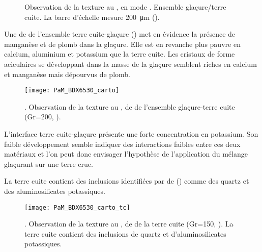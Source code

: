\begin{figure}[htb]
  \caption[\ -- Observation de la texture au \MEB, 
           en mode \ERD. Ensemble glaçure/terre cuite]
          {\legendeC
           Observation de la texture au \MEB, en mode \ERD. 
           Ensemble glaçure/terre cuite. La barre d'échelle mesure 
           \SI{200}{\um} ().}
  \label{MEB:6530_img}
\end{figure}

Une \carto de \RX de l'ensemble terre cuite-glaçure 
() met en évidence la présence de 
manganèse et de plomb dans la glaçure. Elle est en revanche plus 
pauvre en calcium, aluminium et potassium que la terre cuite. Les 
cristaux de forme aciculaires se développant dans la masse de la 
glaçure semblent riches en calcium et manganèse mais dépourvus de 
plomb.

\begin{figure}[htb]
  \texttt{[image: PaM\_BDX6530\_carto]}%
  \caption[\ -- Observation de la texture au \MEB, 
           \carto de \RX de l'ensemble glaçure-terre cuite]
          {\legendeC.
           Observation de la texture au \MEB, 
           \carto de \RX de l'ensemble glaçure-terre cuite 
           (Gr=200, ).}
  \label{MEB:6530_carto_tcgla}
\end{figure}

L'interface terre cuite-glaçure présente une forte concentration en 
potassium. Son faible développement semble indiquer des interactions 
faibles entre ces deux matériaux et l'on peut donc envisager 
l'hypothèse de l'application du mélange glaçurant sur une terre crue.

La terre cuite contient des inclusions identifiées par \carto de \RX 
() comme des quartz et des aluminosilicates 
potassiques.

\begin{figure}[htb]
  \texttt{[image: PaM\_BDX6530\_carto\_tc]}%
  \caption[\ -- Observation de la texture au \MEB, 
           \carto de \RX de la terre cuite]
          {\legendeC.
           Observation de la texture au \MEB, 
           \carto de \RX de la terre cuite 
           (Gr=150, ). La terre cuite contient des 
           inclusions de quartz et d'aluminosilicates potassiques.}
  \label{MEB:6530_carto_tc}
\end{figure}



